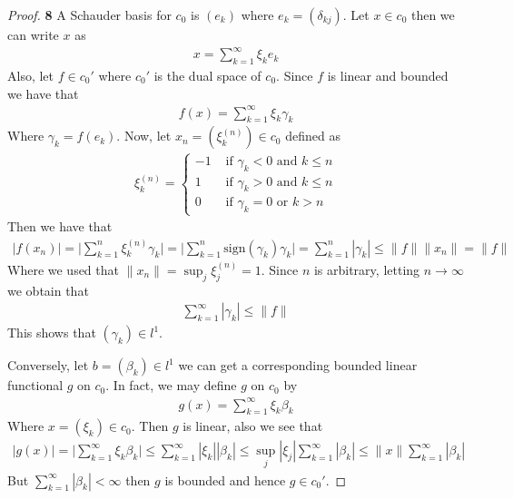 \documentclass[11pt]{article}
\theoremstyle{definition}
\begin{document}
\begin{proof}{\textbf{8}}
    A Schauder basis for $c_0$ is $(e_k)$ where $e_k = (\delta_{kj})$.
    Let $x \in c_0$ then we can write $x$ as
    \begin{align*}
        x = \sum_{k=1}^\infty \xi_k e_k
    \end{align*}
    Also, let $f \in c_0'$ where $c_0'$ is the dual space of $c_0$.
    Since $f$ is linear and bounded we have that
    \begin{align*}
        f(x) = \sum_{k=1}^\infty \xi_k \gamma_k
    \end{align*}
    Where $\gamma_k = f(e_k)$. Now, let $x_n = (\xi_k^{(n)}) \in c_0$ defined as 
    \begin{align*}
        \xi_k^{(n)} = \begin{cases}
            -1 &\text{ if } \gamma_k < 0 \text{ and } k \leq n\\
            1 &\text{ if } \gamma_k > 0 \text{ and } k \leq n\\
            0 &\text{ if } \gamma_k = 0 \text{ or } k > n
        \end{cases}
    \end{align*}
    Then we have that
    \begin{align*}
        |f(x_n)|
        = \bigg|\sum_{k=1}^n \xi_k^{(n)}\gamma_k\bigg|
        = \bigg|\sum_{k=1}^n \text{sign}(\gamma_k)\gamma_k\bigg|
        = \sum_{k=1}^n |\gamma_k|
        \leq \|f\|\|x_n\| = \|f\|
    \end{align*}
    Where we used that $\|x_n\| = \sup_j \xi_j^{(n)} = 1$. Since $n$ is
    arbitrary, letting $n \to \infty$ we obtain that
    \begin{align*}
        \sum_{k=1}^\infty |\gamma_k| \leq \|f\|
    \end{align*}
    This shows that $(\gamma_k) \in l^1$.
    
    Conversely, let $b = (\beta_k) \in l^1$ we can get a corresponding bounded
    linear functional $g$ on $c_0$. In fact, we may define $g$ on $c_0$ by
    \begin{align*}
        g(x) = \sum_{k=1}^\infty \xi_{k}\beta_k
    \end{align*}
    Where $x = (\xi_k)\in c_0$. Then $g$ is linear, also we see that
    \begin{align*}
        |g(x)| = \bigg|\sum_{k=1}^\infty \xi_{k}\beta_k\bigg|
        \leq \sum_{k=1}^\infty |\xi_{k}||\beta_k|
        \leq \sup_j |\xi_j| \sum_{k=1}^\infty |\beta_k|
        \leq \|x\| \sum_{k=1}^\infty |\beta_k|
    \end{align*}
    But $\sum_{k=1}^\infty |\beta_k| < \infty$ then $g$ is bounded and hence
    $g \in c_0'$.


\end{proof}
\end{document}
